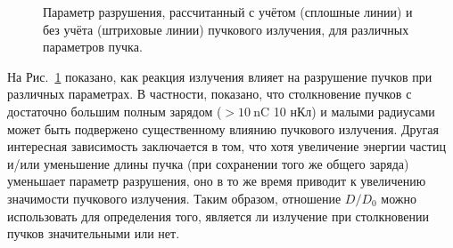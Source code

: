 \begin{figure}[ht]
    \caption[Параметр разрушения, рассчитанный с учётом и без учёта пучкового излучения, для различных параметров пучка]{\label{fig:ch3/Q_disruption} 
    Параметр разрушения, рассчитанный с учётом (сплошные линии) и без учёта (штриховые линии) пучкового излучения, для различных параметров пучка.}
\end{figure}

На Рис.~\ref{fig:ch3/Q_disruption} показано, как реакция излучения влияет на разрушение пучков при различных параметрах.
В частности, показано, что столкновение пучков с достаточно большим полным зарядом ($> \SI{10}{\nano\coulomb}$ 10 нКл) и малыми радиусами может быть подвержено существенному влиянию пучкового излучения.
Другая интересная зависимость заключается в том, что хотя увеличение энергии частиц и/или уменьшение длины пучка (при сохранении того же общего заряда) уменьшает параметр разрушения, оно в то же время приводит к увеличению значимости пучкового излучения.
Таким образом, отношение $D/D_0$ можно использовать для определения того, является ли излучение при столкновении пучков значительными или нет.

